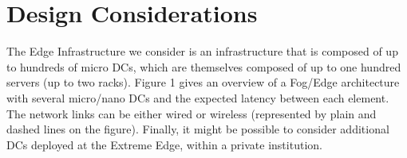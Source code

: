 

\section{Design Considerations}
\label{design_considerations}

The Edge Infrastructure we consider is an infrastructure that
is composed of up to hundreds of micro DCs, which are themselves
composed of up to one hundred servers (up to two racks). Figure 1
gives an overview of a Fog/Edge architecture with several micro/nano
DCs and the expected latency between each element. The network links
can be either wired or wireless (represented by plain and dashed lines
on the figure). Finally, it might be possible to consider additional
DCs deployed at the Extreme Edge, within a private institution.

